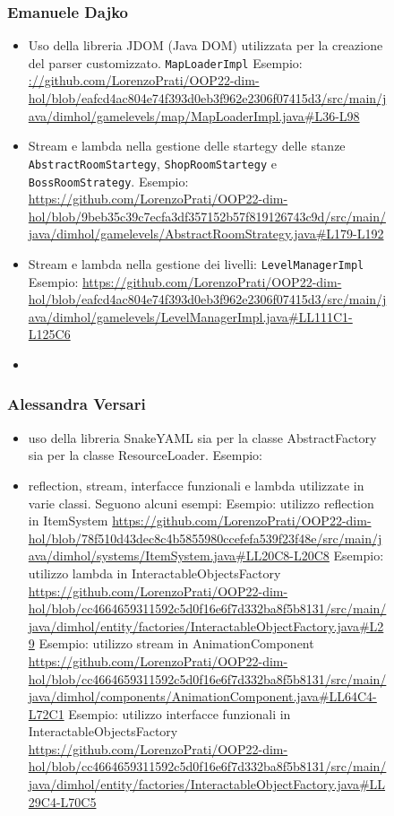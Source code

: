 \documentclass[a4paper,12pt]{report}
\begin{document}
\begin{figure}[h]
\begin{itemize}
\end{itemize}

\subsubsection*{Emanuele Dajko}
\begin{itemize}
	\item Uso della libreria JDOM (Java DOM) utilizzata per la creazione del parser customizzato. \texttt{MapLoaderImpl}
	Esempio: \url{://github.com/LorenzoPrati/OOP22-dim-hol/blob/eafcd4ac804e74f393d0eb3f962e2306f07415d3/src/main/java/dimhol/gamelevels/map/MapLoaderImpl.java#L36-L98}

	\item Stream e lambda nella gestione delle startegy delle stanze \texttt{AbstractRoomStartegy}, \texttt{ShopRoomStartegy} e \texttt{BossRoomStrategy}.
	Esempio: \url{https://github.com/LorenzoPrati/OOP22-dim-hol/blob/9beb35c39c7ecfa3df357152b57f819126743c9d/src/main/java/dimhol/gamelevels/AbstractRoomStrategy.java#L179-L192}

	\item Stream e lambda nella gestione dei livelli: \texttt{LevelManagerImpl}
	Esempio: \url{https://github.com/LorenzoPrati/OOP22-dim-hol/blob/eafcd4ac804e74f393d0eb3f962e2306f07415d3/src/main/java/dimhol/gamelevels/LevelManagerImpl.java#LL111C1-L125C6}
	
	\item 
\end{itemize}

\subsubsection*{Alessandra Versari}
\begin{itemize}
	\item uso della libreria SnakeYAML sia per la classe AbstractFactory sia per la classe ResourceLoader.
	Esempio: \url{}
	\item reflection, stream, interfacce funzionali e lambda utilizzate in varie classi. Seguono alcuni esempi:
	Esempio: utilizzo reflection in ItemSystem \url{https://github.com/LorenzoPrati/OOP22-dim-hol/blob/78f510d43dec8c4b5855980ccefefa539f23f48e/src/main/java/dimhol/systems/ItemSystem.java#LL20C8-L20C8}
	Esempio: utilizzo lambda in InteractableObjectsFactory \url{https://github.com/LorenzoPrati/OOP22-dim-hol/blob/cc4664659311592c5d0f16e6f7d332ba8f5b8131/src/main/java/dimhol/entity/factories/InteractableObjectFactory.java#L29}
	Esempio: utilizzo stream in AnimationComponent \url{https://github.com/LorenzoPrati/OOP22-dim-hol/blob/cc4664659311592c5d0f16e6f7d332ba8f5b8131/src/main/java/dimhol/components/AnimationComponent.java#LL64C4-L72C1}
	Esempio: utilizzo interfacce funzionali in InteractableObjectsFactory \url{https://github.com/LorenzoPrati/OOP22-dim-hol/blob/cc4664659311592c5d0f16e6f7d332ba8f5b8131/src/main/java/dimhol/entity/factories/InteractableObjectFactory.java#LL29C4-L70C5}
\end{itemize}



\end{figure}
\end{document}
